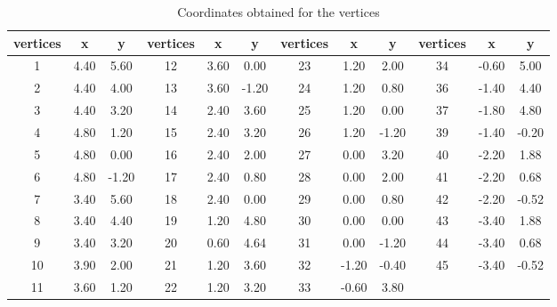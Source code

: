 \begin{table}[]
\centering
\caption{Coordinates obtained for the vertices}
\label{tab:wsuxy}
\begin{tabular}{|c|c|c|c|c|c|c|c|c|c|c|c|}
\hline
vertices & x    & y     & vertices & x    & y     & vertices & x     & y     & vertices & x     & y     \\ \hline
1        & 4.40 & 5.60  & 12       & 3.60 & 0.00  & 23       & 1.20  & 2.00  & 34       & -0.60 & 5.00  \\ \hline
2        & 4.40 & 4.00  & 13       & 3.60 & -1.20 & 24       & 1.20  & 0.80  & 36       & -1.40 & 4.40  \\ \hline
3        & 4.40 & 3.20  & 14       & 2.40 & 3.60  & 25       & 1.20  & 0.00  & 37       & -1.80 & 4.80  \\ \hline
4        & 4.80 & 1.20  & 15       & 2.40 & 3.20  & 26       & 1.20  & -1.20 & 39       & -1.40 & -0.20 \\ \hline
5        & 4.80 & 0.00  & 16       & 2.40 & 2.00  & 27       & 0.00  & 3.20  & 40       & -2.20 & 1.88  \\ \hline
6        & 4.80 & -1.20 & 17       & 2.40 & 0.80  & 28       & 0.00  & 2.00  & 41       & -2.20 & 0.68  \\ \hline
7        & 3.40 & 5.60  & 18       & 2.40 & 0.00  & 29       & 0.00  & 0.80  & 42       & -2.20 & -0.52 \\ \hline
8        & 3.40 & 4.40  & 19       & 1.20 & 4.80  & 30       & 0.00  & 0.00  & 43       & -3.40 & 1.88  \\ \hline
9        & 3.40 & 3.20  & 20       & 0.60 & 4.64  & 31       & 0.00  & -1.20 & 44       & -3.40 & 0.68  \\ \hline
10       & 3.90 & 2.00  & 21       & 1.20 & 3.60  & 32       & -1.20 & -0.40 & 45       & -3.40 & -0.52 \\ \hline
11       & 3.60 & 1.20  & 22       & 1.20 & 3.20  & 33       & -0.60 & 3.80  &          &       &       \\ \hline
\end{tabular}
\end{table}









